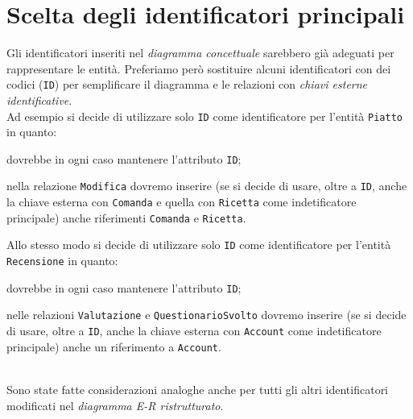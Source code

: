 \section{Scelta degli identificatori principali}
Gli identificatori inseriti nel {\it diagramma concettuale} sarebbero già adeguati
per rappresentare le entità. Preferiamo però sostituire alcuni identificatori con
dei codici ({\tt ID}) per semplificare il diagramma e le relazioni con {\it chiavi
esterne identificative}.\\

Ad esempio si decide di utilizzare solo {\tt ID} come identificatore per l'entità
{\tt Piatto} in quanto:
\begin{inparaenum}[1)]
    \item dovrebbe in ogni caso mantenere l'attributo {\tt ID};
    \item nella relazione {\tt Modifica} dovremo inserire (se si decide di usare, oltre a {\tt ID},
        anche la chiave esterna con {\tt Comanda} e quella con {\tt Ricetta} come
        indetificatore principale) anche riferimenti {\tt Comanda} e {\tt Ricetta}.
\end{inparaenum}

Allo stesso modo si decide di utilizzare solo {\tt ID} come identificatore per
l'entità {\tt Recensione} in quanto:
\begin{inparaenum}[1)]
    \item dovrebbe in ogni caso mantenere l'attributo {\tt ID};
    \item nelle relazioni {\tt Valutazione} e {\tt QuestionarioSvolto} dovremo inserire
        (se si decide di usare, oltre a {\tt ID}, anche la chiave esterna con {\tt Account} come
        indetificatore principale) anche un riferimento a {\tt Account}.
\end{inparaenum}\\

Sono state fatte considerazioni analoghe anche per tutti gli altri identificatori
modificati nel {\it diagramma E-R ristrutturato}.
